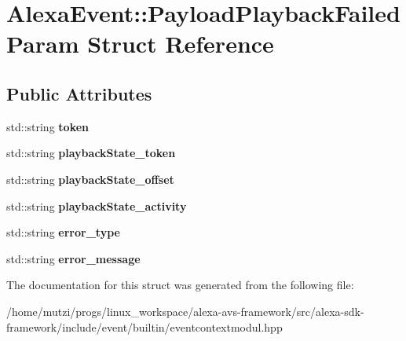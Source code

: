 \hypertarget{structAlexaEvent_1_1PayloadPlaybackFailedParam}{}\section{Alexa\+Event\+:\+:Payload\+Playback\+Failed\+Param Struct Reference}
\label{structAlexaEvent_1_1PayloadPlaybackFailedParam}
\subsection*{Public Attributes}
\begin{DoxyCompactItemize}
\item 
\mbox{\label{structAlexaEvent_1_1PayloadPlaybackFailedParam_a2dafb25b0ef50a2b3201530a2d5954d5}} 
std\+::string {\bfseries token}
\item 
\mbox{\label{structAlexaEvent_1_1PayloadPlaybackFailedParam_ad40aea51516ffff03685dd8909501afb}} 
std\+::string {\bfseries playback\+State\+\_\+token}
\item 
\mbox{\label{structAlexaEvent_1_1PayloadPlaybackFailedParam_ab8229db537edc173a94601fc72b8288b}} 
std\+::string {\bfseries playback\+State\+\_\+offset}
\item 
\mbox{\label{structAlexaEvent_1_1PayloadPlaybackFailedParam_a1b006f401bea72feaa177432422609d7}} 
std\+::string {\bfseries playback\+State\+\_\+activity}
\item 
\mbox{\label{structAlexaEvent_1_1PayloadPlaybackFailedParam_a68ad2381c95b68bf527875241ec89c35}} 
std\+::string {\bfseries error\+\_\+type}
\item 
\mbox{\label{structAlexaEvent_1_1PayloadPlaybackFailedParam_aec1bbf4e0bb890c11e94ebeacefafb5c}} 
std\+::string {\bfseries error\+\_\+message}
\end{DoxyCompactItemize}


The documentation for this struct was generated from the following file\+:\begin{DoxyCompactItemize}
\item 
/home/mutzi/progs/linux\+\_\+workspace/alexa-\/avs-\/framework/src/alexa-\/sdk-\/framework/include/event/builtin/eventcontextmodul.\+hpp\end{DoxyCompactItemize}
